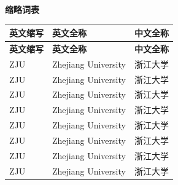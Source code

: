 \cleardoublepage
\begin{center}
    \bfseries {} 缩略词表
\end{center}

\begin{center}
    \begin{longtable}{m{2cm}m{8cm}m{5cm}}
        \toprule
        \textbf{英文缩写}&\textbf{英文全称}&\textbf{中文全称}\\
        \midrule
        \endfirsthead
        \toprule
        \textbf{英文缩写}&\textbf{英文全称}&\textbf{中文全称}\\
        \midrule
        \endhead 
        \bottomrule
        \endfoot
        \bottomrule
        \endlastfoot
        ZJU&Zhejiang University&浙江大学\\
        ZJU&Zhejiang University&浙江大学\\
        ZJU&Zhejiang University&浙江大学\\
        ZJU&Zhejiang University&浙江大学\\
        ZJU&Zhejiang University&浙江大学\\
        ZJU&Zhejiang University&浙江大学\\
        ZJU&Zhejiang University&浙江大学\\
        ZJU&Zhejiang University&浙江大学\\
	\end{longtable}
\end{center}